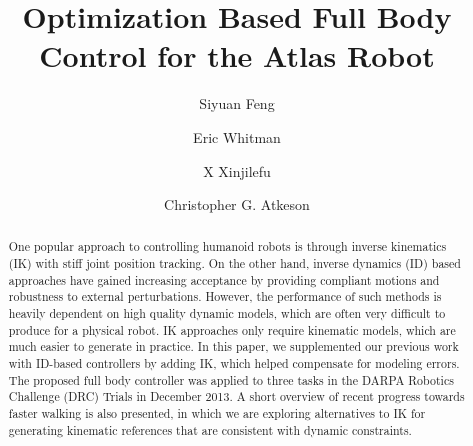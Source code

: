 \documentclass{ws-ijhr}
\begin{document}

%
\catchline{}{}{}{}{}
%

\title{Optimization Based Full Body Control for the Atlas Robot}

\author{Siyuan Feng}
\address{The Robotics Institute, Carnegie Mellon 
  University, 5000 Forbes Avenue, Pittsburgh, PA 15213, USA \\
	sfeng@cs.cmu.edu}

\author{Eric Whitman}
\address{
	Boston Dynamics / Google, 78 Fourth Avenue, Waltham, MA 02451, USA \\
	ewhitman@bostondynamics.com}

\author{X Xinjilefu}
\address{The Robotics Institute, Carnegie Mellon 
  University, 5000 Forbes Avenue, Pittsburgh, PA 15213, USA \\
	xxinjile@andrew.cmu.edu} 

\author{Christopher G. Atkeson}
\address{The Robotics Institute, Carnegie Mellon 
  University, 5000 Forbes Avenue, Pittsburgh, PA 15213, USA \\
	cga@cs.cmu.edu} 

\maketitle

\begin{history}
\end{history}

\begin{abstract}
One popular approach to controlling humanoid robots is through inverse kinematics 
(IK) with stiff joint position tracking. On the other hand, inverse dynamics 
(ID) based approaches have gained increasing acceptance by providing compliant 
motions and robustness to external perturbations. However, the performance of 
such methods is heavily dependent on high quality dynamic models, which are 
often very difficult to produce for a physical robot. IK approaches only 
require kinematic models, which are much easier to generate in practice. In this 
paper, we supplemented our previous work with ID-based controllers by adding IK, 
which helped compensate for modeling errors. The proposed full body controller 
was applied to three tasks in the DARPA Robotics Challenge (DRC) Trials in December
2013. A short overview of recent progress towards faster walking is also 
presented, in which we are exploring alternatives to IK for generating kinematic 
references that are consistent with dynamic constraints.
\end{abstract}
\end{document}

